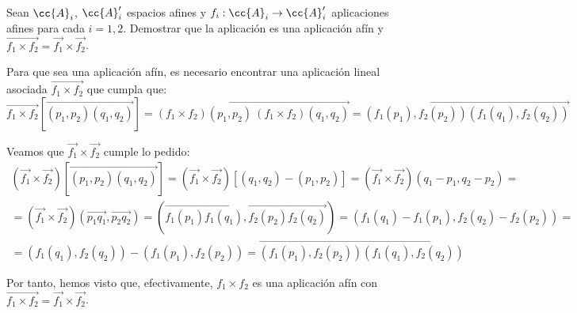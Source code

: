 \begin{ejercicio}
    Sean $\cc{A}_i$, $\cc{A}_i'$ espacios afines y $f_i : \cc{A}_i \to \cc{A}_i'$ aplicaciones afines para cada $i = 1, 2$. Demostrar que la aplicación
    es una aplicación afín y $\vec{f_1\times f_2}=\vec{f_1}\times \vec{f_2}$.

    Para que sea una aplicación afín, es necesario encontrar una aplicación lineal asociada $\vec{f_1\times f_2}$ que cumpla que:
    \begin{equation*}
        \vec{f_1\times f_2}[\vec{(p_1,p_2)(q_1,q_2)}]
        = \vec{(f_1\times f_2)(p_1,p_2)~ (f_1\times f_2)(q_1,q_2)}
        = \vec{(f_1(p_1),f_2(p_2))(f_1(q_1),f_2(q_2))}
    \end{equation*}

    Veamos que $\vec{f_1}\times\vec{f_2}$ cumple lo pedido:
    \begin{multline*}
        (\vec{f_1}\times \vec{f_2})[\vec{(p_1,p_2)(q_1,q_2)}]
        = (\vec{f_1}\times \vec{f_2})[(q_1,q_2) - (p_1,p_2)] = (\vec{f_1}\times \vec{f_2})(q_1-p_1, q_2-p_2)
        =\\= (\vec{f_1}\times \vec{f_2})(\vec{p_1q_1}, \vec{p_2q_2})
        = (\vec{f_1(p_1)f_1(q_1)}, \vec{f_2(p_2)f_2(q_2)})
        = (f_1(q_1)-f_1(p_1), f_2(q_2)-f_2(p_2)) =\\
        = (f_1(q_1), f_2(q_2)) - (f_1(p_1), f_2(p_2)) = \vec{(f_1(p_1), f_2(p_2))(f_1(q_1), f_2(q_2))}
    \end{multline*}

    Por tanto, hemos visto que, efectivamente, $f_1\times f_2$ es una aplicación afín con $\vec{f_1\times f_2}=\vec{f_1}\times \vec{f_2}$.
\end{ejercicio}

